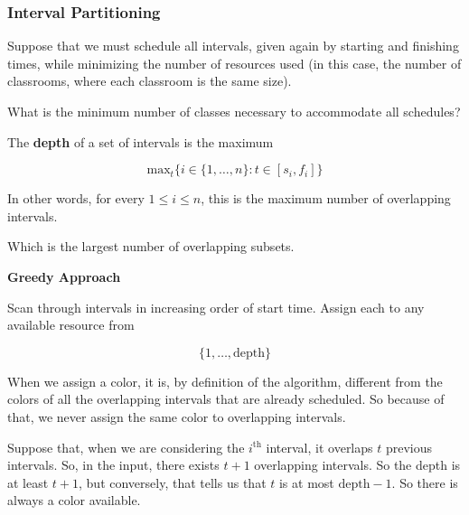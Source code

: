 \documentclass[12pt]{article}
\begin{document}
  \subsubsection{Interval Partitioning}

  Suppose that we must schedule all intervals, given again by starting and
  finishing times, while minimizing the number of resources used (in this case,
  the number of classrooms, where each classroom is the same size).

  What is the minimum number of classes necessary to accommodate all schedules?


   {
    The {\bf depth} of a set of intervals is the maximum 

    \[
      \text{max}_t \Big\{i \in \{ 1, \dots, n\} : t \in [s_i, f_i] \Big\}
    \]

    In other words, for every $1 \le i \le n$, this is the maximum number of
    overlapping intervals.

    Which is the largest number of overlapping subsets.
  }


  {\bf Greedy Approach}

  Scan through intervals in increasing order of start time. Assign each to any
  available resource from 

  \[
    \{1, \dots, \text{depth}\}
  \]

  {
    When we assign a color, it is, by definition of the algorithm, different from
    the colors of all the overlapping intervals that are already scheduled. So
    because of that, we never assign the same color to overlapping intervals.

    Suppose that, when we are considering the $i^\text{th}$ interval, it overlaps
    $t$ previous intervals. So, in the input, there exists $t + 1$ overlapping
    intervals. So the depth is at least $t + 1$, but conversely, that tells us
    that $t$ is at most $\text{depth} - 1$. So there is always a color available.
  }
\end{document}
